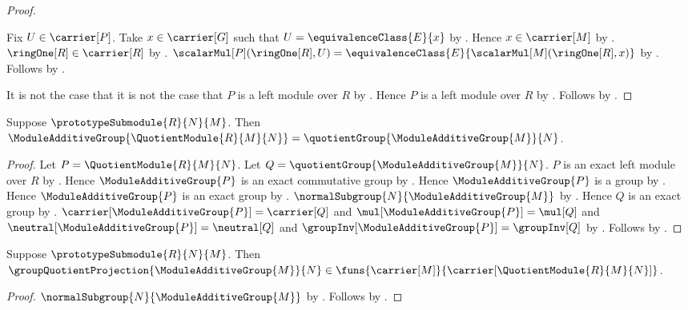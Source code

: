 \begin{proof}
\begin{subproof}
        Fix $U\in\carrier[P]$.
        Take $x\in\carrier[G]$ such that
            $U=\equivalenceClass{E}{x}$ by
            .
        Hence $x\in\carrier[M]$ by
            .
        $\ringOne[R]\in\carrier[R]$ by .
        $\scalarMul[P](\ringOne[R],U)
            =\equivalenceClass{E}{\scalarMul[M](\ringOne[R],x)}$ by
            .
        Follows by .
    \end{subproof}
    It is not the case that it is not the case that
        $P$ is a left module over $R$ by
        .
    Hence $P$ is a left module over $R$ by \auto.
    Follows by
        .
\end{proof}

\begin{theorem}\label{spike_quotient_module_additive_reduct}
    Suppose $\prototypeSubmodule{R}{N}{M}$.
    Then
        $\ModuleAdditiveGroup{\QuotientModule{R}{M}{N}}
            =\quotientGroup{\ModuleAdditiveGroup{M}}{N}$.
\end{theorem}
\begin{proof}
    Let $P=\QuotientModule{R}{M}{N}$.
    Let $Q=\quotientGroup{\ModuleAdditiveGroup{M}}{N}$.
    $P$ is an exact left module over $R$ by
        .
    Hence $\ModuleAdditiveGroup{P}$ is an exact commutative group by
        .
    Hence $\ModuleAdditiveGroup{P}$ is a group by
        .
    Hence $\ModuleAdditiveGroup{P}$ is an exact group by
        .
    $\normalSubgroup{N}{\ModuleAdditiveGroup{M}}$ by
        .
    Hence $Q$ is an exact group by
        .
    $\carrier[\ModuleAdditiveGroup{P}]=\carrier[Q]$ and
        $\mul[\ModuleAdditiveGroup{P}]=\mul[Q]$ and
        $\neutral[\ModuleAdditiveGroup{P}]=\neutral[Q]$ and
        $\groupInv[\ModuleAdditiveGroup{P}]=\groupInv[Q]$ by
        .
    Follows by .
\end{proof}

\begin{proposition}\label{spike_quotient_projection_reused}
    Suppose $\prototypeSubmodule{R}{N}{M}$.
    Then
        $\groupQuotientProjection{\ModuleAdditiveGroup{M}}{N}
            \in\funs{\carrier[M]}{
                \carrier[\QuotientModule{R}{M}{N}]}$.
\end{proposition}
\begin{proof}
    $\normalSubgroup{N}{\ModuleAdditiveGroup{M}}$ by
        .
    Follows by
        .
\end{proof}
